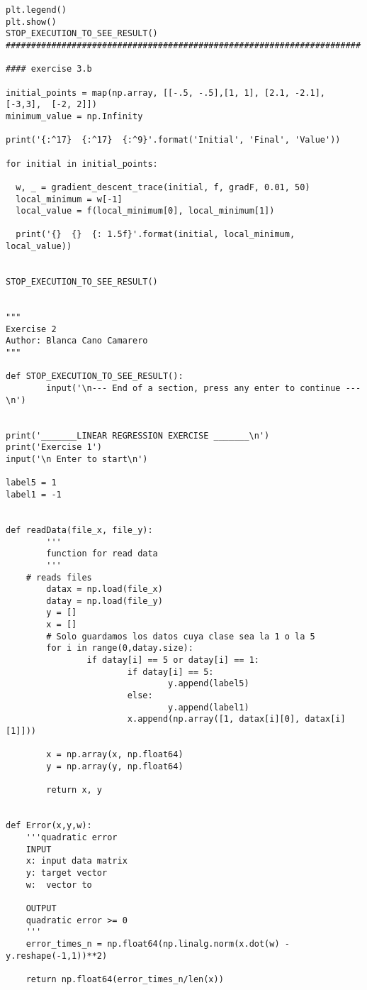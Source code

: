 \begin{verbatim}
plt.legend()
plt.show()
STOP_EXECUTION_TO_SEE_RESULT()
######################################################################

#### exercise 3.b

initial_points = map(np.array, [[-.5, -.5],[1, 1], [2.1, -2.1], [-3,3],  [-2, 2]])
minimum_value = np.Infinity

print('{:^17}  {:^17}  {:^9}'.format('Initial', 'Final', 'Value'))

for initial in initial_points:
 
  w, _ = gradient_descent_trace(initial, f, gradF, 0.01, 50)
  local_minimum = w[-1]
  local_value = f(local_minimum[0], local_minimum[1])

  print('{}  {}  {: 1.5f}'.format(initial, local_minimum, local_value))

  
STOP_EXECUTION_TO_SEE_RESULT()


"""
Exercise 2 
Author: Blanca Cano Camarero
"""

def STOP_EXECUTION_TO_SEE_RESULT():
        input('\n--- End of a section, press any enter to continue ---\n')
        

print('_______LINEAR REGRESSION EXERCISE _______\n')
print('Exercise 1')
input('\n Enter to start\n') 

label5 = 1
label1 = -1


def readData(file_x, file_y):
        '''
        function for read data
        '''
	# reads files
        datax = np.load(file_x)
        datay = np.load(file_y)
        y = []
        x = []	
        # Solo guardamos los datos cuya clase sea la 1 o la 5
        for i in range(0,datay.size):
                if datay[i] == 5 or datay[i] == 1:
                        if datay[i] == 5:
                                y.append(label5)
                        else:
                                y.append(label1)
                        x.append(np.array([1, datax[i][0], datax[i][1]]))

        x = np.array(x, np.float64)
        y = np.array(y, np.float64)
	
        return x, y


def Error(x,y,w):
    '''quadratic error 
    INPUT
    x: input data matrix
    y: target vector
    w:  vector to 

    OUTPUT
    quadratic error >= 0
    '''
    error_times_n = np.float64(np.linalg.norm(x.dot(w) - y.reshape(-1,1))**2)
  
    return np.float64(error_times_n/len(x))



\end{verbatim}
